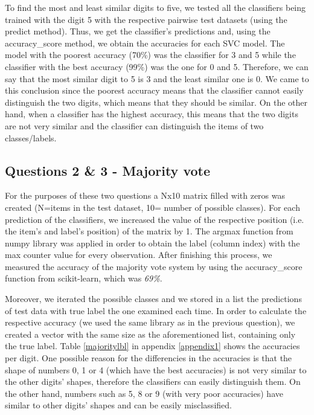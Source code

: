 \documentclass[12pt]{article}
\begin{document}
	To find the most and least similar digits to five, we tested all the classifiers being trained with the digit 5 with the respective pairwise test datasets (using the predict method). Thus, we get the classifier's predictions and, using the accuracy\_score method, we obtain the accuracies for each SVC model. The model with the poorest accuracy (70\%) was the classifier for 3 and 5 while the classifier with the best accuracy (99\%) was the one for 0 and 5. Therefore, we can say that the most similar digit to 5 is 3 and the least similar one is 0. We came to this conclusion since the poorest accuracy means that the classifier cannot easily distinguish the two digits, which means that they should be similar. On the other hand, when a classifier has the highest accuracy, this means that the two digits are not very similar and the classifier can distinguish the items of two classes/labels.
	
	\subsection{Questions 2 \& 3 - Majority vote}
	
	For the purposes of these two questions a Nx10 matrix filled with zeros was created (N=items in the test dataset, 10= number of possible classes). For each prediction of the classifiers, we increased the value of the respective position (i.e. the item's and label's position) of the matrix by 1. The argmax function from numpy library was applied in order to obtain the label (column index) with the max counter value for every observation. After finishing this process, we measured the accuracy of the majority vote system by using the accuracy\_score function from scikit-learn, which was \emph{69\%}.
	
	Moreover, we iterated the possible classes and we stored in a list the predictions of test data with true label the one examined each time. In order to calculate the respective accuracy (we used the same library as in the previous question), we created a vector with the same size as the aforementioned list, containing only the true label. Table \ref{majoritylbl} in appendix \ref{appendix1} shows the accuracies per digit. One possible reason for the differencies in the accuracies is that the shape of numbers 0, 1 or 4 (which have the best accuracies) is not very similar to the other digits' shapes, therefore the classifiers can easily distinguish them. On the other hand, numbers such as 5, 8 or 9 (with very poor accuracies) have similar to other digits' shapes and can be easily misclassified.
	
\end{document}
